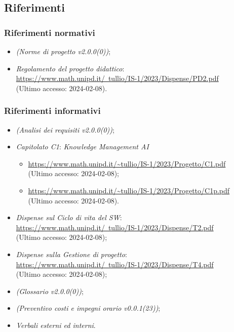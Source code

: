 \documentclass[10pt, a4paper]{article}
\begin{document}
\subsection{Riferimenti}

\subsubsection{Riferimenti normativi} 
\begin{itemize}
    \item \textit{(Norme di progetto v2.0.0(0))};
    \item \textit{Regolamento del progetto didattico}: \\
    \href{https://www.math.unipd.it/~tullio/IS-1/2023/Dispense/PD2.pdf}{https://www.math.unipd.it/~tullio/IS-1/2023/Dispense/PD2.pdf}\\
    (Ultimo accesso: 2024-02-08).
\end{itemize}

\subsubsection{Riferimenti informativi}
\begin{itemize}
    \item \textit{(Analisi dei requisiti v2.0.0(0))};
    \item \textit{Capitolato C1}: \textit{Knowledge Management AI}
    \begin{itemize}
        \item \url{https://www.math.unipd.it/~tullio/IS-1/2023/Progetto/C1.pdf}\\
        (Ultimo accesso: 2024-02-08);
        \item \url{https://www.math.unipd.it/~tullio/IS-1/2023/Progetto/C1p.pdf}\\
        (Ultimo accesso: 2024-02-08).
    \end{itemize}
    \item \textit{Dispense sul Ciclo di vita del SW\pg}:\\
    \href{https://www.math.unipd.it/~tullio/IS-1/2023/Dispense/T2.pdf}{https://www.math.unipd.it/~tullio/IS-1/2023/Dispense/T2.pdf}\\
    (Ultimo accesso: 2024-02-08);
    \item  \textit{Dispense sulla Gestione di progetto}:\\
    \href{https://www.math.unipd.it/~tullio/IS-1/2023/Dispense/T4.pdf}{https://www.math.unipd.it/~tullio/IS-1/2023/Dispense/T4.pdf}\\
    (Ultimo accesso: 2024-02-08);
    \item \textit{(Glossario v2.0.0(0))};
    \item \textit{(Preventivo costi e impegni orario v0.0.1(23))};
    \item \textit{Verbali esterni ed interni}.
\end{itemize}
\end{document}
